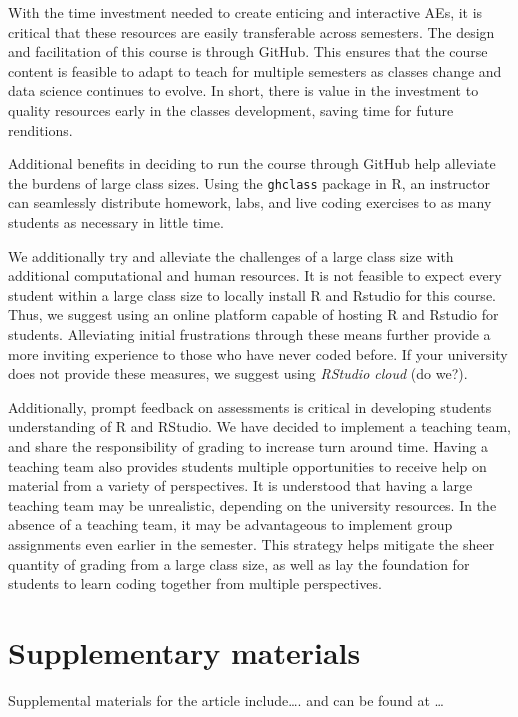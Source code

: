 \documentclass[
  12pt]{article}
\begin{document}
With the time investment needed to create enticing and interactive AEs,
it is critical that these resources are easily transferable across
semesters. The design and facilitation of this course is through GitHub.
This ensures that the course content is feasible to adapt to teach for
multiple semesters as classes change and data science continues to
evolve. In short, there is value in the investment to quality resources
early in the classes development, saving time for future renditions.

Additional benefits in deciding to run the course through GitHub help
alleviate the burdens of large class sizes. Using the \texttt{ghclass}
package in R, an instructor can seamlessly distribute homework, labs,
and live coding exercises to as many students as necessary in little
time.

We additionally try and alleviate the challenges of a large class size
with additional computational and human resources. It is not feasible to
expect every student within a large class size to locally install R and
Rstudio for this course. Thus, we suggest using an online platform
capable of hosting R and Rstudio for students. Alleviating initial
frustrations through these means further provide a more inviting
experience to those who have never coded before. If your university does
not provide these measures, we suggest using \emph{RStudio cloud} (do
we?).

Additionally, prompt feedback on assessments is critical in developing
students understanding of R and RStudio. We have decided to implement a
teaching team, and share the responsibility of grading to increase turn
around time. Having a teaching team also provides students multiple
opportunities to receive help on material from a variety of
perspectives. It is understood that having a large teaching team may be
unrealistic, depending on the university resources. In the absence of a
teaching team, it may be advantageous to implement group assignments
even earlier in the semester. This strategy helps mitigate the sheer
quantity of grading from a large class size, as well as lay the
foundation for students to learn coding together from multiple
perspectives.

\newpage

\hypertarget{supplementary-materials}{%
\section{Supplementary materials}\label{supplementary-materials}}

Supplemental materials for the article include\ldots. and can be found
at \ldots{}

\newpage


\renewcommand\refname{References}
  
\end{document}
